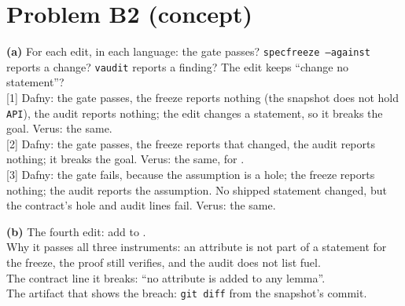 \documentclass[11pt]{article}
\begin{document}
\section*{Problem B2 (concept)}\label{ans:B2}
\begin{answer}
\textbf{(a)} For each edit, in each language: the gate passes? \texttt{specfreeze
--against} reports a change? \texttt{vaudit} reports a finding? The edit keeps
``change no statement''? \\
{[1]} Dafny: the gate passes, the freeze reports nothing (the snapshot does not
hold \texttt{API}), the audit reports nothing; the edit changes a statement, so
it breaks the goal. \quad Verus: the same. \\
{[2]} Dafny: the gate passes, the freeze reports that  changed,
the audit reports nothing; it breaks the goal. \quad Verus: the same, for
. \\
{[3]} Dafny: the gate fails, because the assumption is a hole; the freeze
reports nothing; the audit reports the assumption. No shipped statement
changed, but the contract's hole and audit lines fail. \quad Verus: the same.

\textbf{(b)} The fourth edit: add  to
. \\
Why it passes all three instruments: an attribute is not part of a statement
for the freeze, the proof still verifies, and the audit does not list fuel. \\
The contract line it breaks: ``no  attribute is added to any
lemma''. \\
The artifact that shows the breach: \texttt{git diff} from the snapshot's
commit.
\end{answer}

\end{document}
